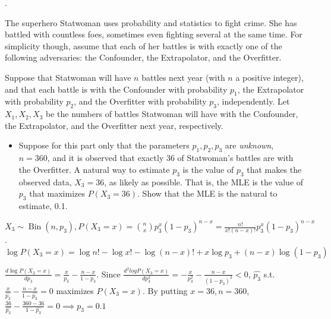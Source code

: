 \documentclass[8pt]{beamer}
\newcommand{\ti}[1]{\textit{#1}}
\newcommand{\Bin}[2]{\operatorname{Bin}\!\left(#1,#2\right)}
\begin{document}
\begin{frame}{.}
    \begin{example}[Statwoman]
        The superhero Statwoman uses probability and statistics to fight crime. She has battled with countless foes, sometimes even fighting several at the same time. For simplicity though, assume that each of her battles is with exactly one of the following adversaries: the Confounder, the Extrapolator, and the Overfitter.

        Suppose that Statwoman will have $n$ battles next year (with $n$ a positive integer), and that each battle is with the Confounder with probability $p_1$, the Extrapolator with probability $p_2$, and the Overfitter with probability $p_3$, independently. Let $X_1, X_2, X_3$ be the numbers of battles Statwoman will have with the Confounder, the Extrapolator, and the Overfitter next year, respectively.

        \begin{itemize}
        \item Suppose for this part only that the parameters $p_1, p_2, p_3$ are \ti{unknown}, $n=360$, and it is observed that exactly $36$ of Statwoman's battles are with the Overfitter. A natural way to estimate $p_3$ is the value of $p_3$ that makes the observed data, $X_3 = 36$, as likely as possible. That is, the MLE is the value of $p_3$ that maximizes $P(X_3=36)$. Show that the MLE is the natural to estimate, 0.1.
        \end{itemize}

        $X_3 \sim \Bin{n}{p_3}, P(X_3 = x) = \binom{n}{x} p_3^x (1-p_3)^{n-x} = \frac{n!}{x! (n-x)!}p_3^x (1-p_3)^{n-x}$. 
        $\log{P(X_3=x)} = \log{n!} - \log{x!} - \log{(n-x)!} + x\log{p_3} + (n-x)\log{(1-p_3)}$

        $\frac{d \log{P(X_3=x)}}{dp_3} = \frac{x}{p_3} - \frac{n-x}{1-p_3}$. 
        Since $\frac{d^2 log{P(X_3=x)}}{dp_3^2} = -\frac{x}{p_3^2} - \frac{n-x}{(1-p_3)^2} < 0$,  $\hat{p_3}$ s.t. $\frac{x}{\hat{p_3}} - \frac{n-x}{1 - \hat{p_3}}= 0$ maximizes $P(X_3=x)$. By putting $x=36, n=360$, $\frac{36}{\hat{p_3}} - \frac{360 - 36}{1 - \hat{p_3}} = 0 \implies p_3 = 0.1$
    \end{example}
\end{frame}
\end{document}
